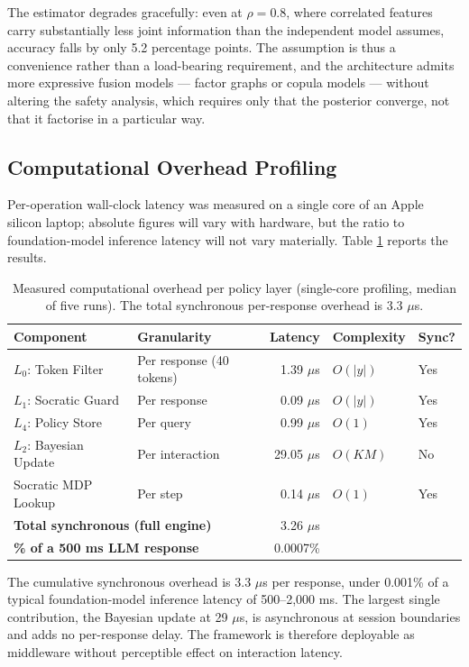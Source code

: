 \documentclass[fleqn,10pt]{wlscirep}
\begin{document}
The estimator degrades gracefully: even at $\rho = 0.8$, where correlated features carry substantially less joint information than the independent model assumes, accuracy falls by only 5.2 percentage points. The assumption is thus a convenience rather than a load-bearing requirement, and the architecture admits more expressive fusion models --- factor graphs or copula models --- without altering the safety analysis, which requires only that the posterior converge, not that it factorise in a particular way.

\subsection*{Computational Overhead Profiling}

Per-operation wall-clock latency was measured on a single core of an Apple silicon laptop; absolute figures will vary with hardware, but the ratio to foundation-model inference latency will not vary materially. Table \ref{tab:overhead_revised} reports the results.

\begin{table}[H]
\centering
\caption{Measured computational overhead per policy layer (single-core profiling, median of five runs). The total synchronous per-response overhead is 3.3 $\mu$s.}
\label{tab:overhead_revised}
\small
\begin{tabular}{llrll}
\hline
\textbf{Component} & \textbf{Granularity} & \textbf{Latency} & \textbf{Complexity} & \textbf{Sync?} \\
\hline
$L_0$: Token Filter      & Per response (40 tokens) & 1.39 $\mu$s & $O(|y|)$  & Yes \\
$L_1$: Socratic Guard    & Per response & 0.09 $\mu$s & $O(|y|)$ & Yes \\
$L_4$: Policy Store      & Per query    & 0.99 $\mu$s & $O(1)$    & Yes \\
$L_2$: Bayesian Update   & Per interaction & 29.05 $\mu$s & $O(KM)$ & No \\
Socratic MDP Lookup      & Per step     & 0.14 $\mu$s & $O(1)$    & Yes \\
\hline
\multicolumn{2}{l}{\textbf{Total synchronous (full engine)}} & 3.26 $\mu$s & & \\
\multicolumn{2}{l}{\textbf{\% of a 500 ms LLM response}} & 0.0007\% & & \\
\hline
\end{tabular}
\end{table}

The cumulative synchronous overhead is 3.3 $\mu$s per response, under 0.001\% of a typical foundation-model inference latency of 500--2,000 ms. The largest single contribution, the Bayesian update at 29 $\mu$s, is asynchronous at session boundaries and adds no per-response delay. The framework is therefore deployable as middleware without perceptible effect on interaction latency.
\end{document}
